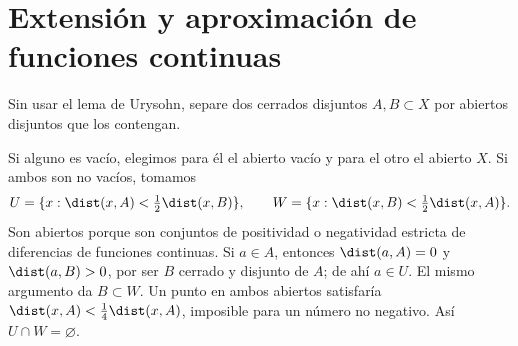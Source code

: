 \chapter{Extensión y aproximación de funciones continuas}

\begin{ejercicio}\label{ej:lectura-12-1}
Sin usar el lema de Urysohn, separe dos cerrados disjuntos $A,B\subset X$ por abiertos disjuntos que los contengan.
\end{ejercicio}
\begin{solucion}
Si alguno es vacío, elegimos para él el abierto vacío y para el otro el abierto $X$. Si ambos son no vacíos, tomamos
\[
 U=\{x:\dist(x,A)<\tfrac12\dist(x,B)\},\qquad
 W=\{x:\dist(x,B)<\tfrac12\dist(x,A)\}.
\]
Son abiertos porque son conjuntos de positividad o negatividad estricta de diferencias de funciones continuas. Si $a\in A$, entonces $\dist(a,A)=0$ y $\dist(a,B)>0$, por ser $B$ cerrado y disjunto de $A$; de ahí $a\in U$. El mismo argumento da $B\subset W$. Un punto en ambos abiertos satisfaría $\dist(x,A)<\frac14\dist(x,A)$, imposible para un número no negativo. Así $U\cap W=\varnothing$.
\end{solucion}

